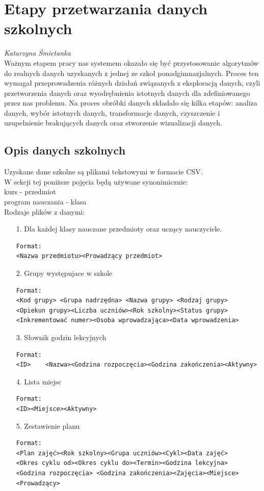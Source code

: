
\chapter{Etapy przetwarzania danych szkolnych}
\textit{Katarzyna Śmietanka} \\
Ważnym etapem pracy nas systemem okazało się być przystosowanie algorytmów do realnych danych uzyskanych z jednej ze szkoł ponadgimnazjalnych. Proces ten wymagał przeprowadzenia różnych działań związanych z eksploracją danych, czyli przetworzenia danych oraz wyodrębnienia istotnych danych dla zdefiniowanego przez nas problemu. Na proces obróbki danych składało się kilka etapów: analiza danych, wybór istotnych danych, transformacje danych, czyszczenie i uzupełnienie brakujących danych oraz stworzenie wizualizacji danych.
\section{Opis danych szkolnych}
Uzyskane dane szkolne są plikami tekstowymi w formacie CSV. \\
W sekcji tej poniższe pojęcia będą używane synonimicznie: \\
kurs - przedmiot \\
program nauczania - klasa \\
Rodzaje plików z danymi:
\begin{enumerate}
\item[1.] Dla każdej klasy nauczane przedmioty oraz uczący nauczyciele.
\begin{verbatim}
Format:
<Nazwa przedmiotu><Prowadzący przedmiot>
\end{verbatim}
\item[2.] Grupy występujace w szkole
\begin{verbatim}
Format:
<Kod grupy> <Grupa nadrzędna> <Nazwa grupy> <Rodzaj grupy> 
<Opiekun grupy><Liczba uczniów><Rok szkolny><Status grupy>
<Inkrementować numer><Osoba wprowadzająca><Data wprowadzenia>
\end{verbatim}
\item[3.] Słownik godzin lekcyjnych
\begin{verbatim}
Format:
<ID>	<Nazwa><Godzina rozpoczęcia><Godzina zakończenia><Aktywny>
\end{verbatim}
\item[4.] Lista miejsc
\begin{verbatim}
Format:
<ID><Miejsce><Aktywny>
\end{verbatim}
\item[5.] Zestawienie planu
\begin{verbatim}
Format:
<Plan zajęć><Rok szkolny><Grupa uczniów><Cykl><Data zajęć>
<Okres cyklu od><Okres cyklu do><Termin><Godzina lekcyjna>
<Godzina rozpoczęcia> <Godzina zakończenia><Zajęcia><Miejsce><Prowadzący>
\end{verbatim}
\end{enumerate}
